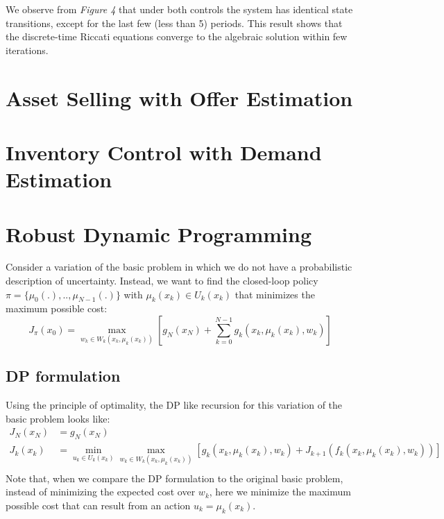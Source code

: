 \documentclass[11pt, oneside]{article}   	%
\begin{document}
We observe from \textit{Figure 4} that under both controls the system has identical state transitions, except for the last few (less than 5) periods. This result shows that the discrete-time Riccati equations converge to the algebraic solution within few iterations.

\section{Asset Selling with Offer Estimation}


\section{Inventory Control with Demand Estimation}


\section{Robust Dynamic Programming}
Consider a variation of the basic problem in which we do not have a probabilistic description of uncertainty. Instead, we want to find the closed-loop policy $\pi = \{\mu_0(.),..,\mu_{N-1}(.)\}$ with $\mu_k(x_k) \in U_k(x_k)$ that minimizes the maximum possible cost:
$$
J_{\pi}(x_0) = \max_{w_k \in W_k(x_k,\mu_k(x_k))} \left[ g_N(x_N) + \sum_{k=0}^{N-1} g_k(x_k,\mu_k(x_k), w_k)\right]
$$

\subsection{DP formulation}
Using the principle of optimality, the DP like recursion for this variation of the basic problem looks like:
\begin{align*}
J_{N}(x_{N}) &= g_N(x_N)\\
J_{k}(x_{k}) &= \min_{u_k \in U_k(x_k)} \max_{w_k \in W_k(x_k,\mu_k(x_k))} \left[ g_k(x_k,\mu_k(x_k),w_k) + J_{k+1}(f_k(x_k,\mu_k(x_k),w_k))\right]\\
\end{align*}
Note that, when we compare the DP formulation to the original basic problem, instead of minimizing the expected cost over $w_k$, here we minimize the maximum possible cost that can result from an action $u_k=\mu_k(x_k)$.
\end{document}
